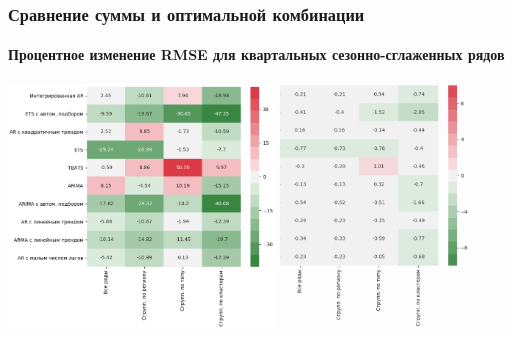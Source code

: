 \documentclass[c, dvipsnames]{beamer}  %
\begin{document}
\begin{frame}[shrink=5]
\frametitle{Сравнение суммы и оптимальной комбинации } 
\framesubtitle{Процентное изменение RMSE для квартальных сезонно-сглаженных  рядов}

\vfil
\hfil\hfil\includegraphics[height=6.5cm]{screenshot057}\hfil\hfil
\includegraphics[height=6.5cm]{screenshot060}\newline
\null\hfil\hfil{}
\hfil\hfil{}
\end{frame}
\end{document}
